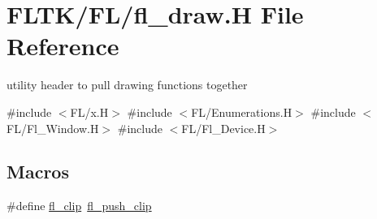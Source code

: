 \hypertarget{fl__draw_8_h}{}\section{F\+L\+T\+K/\+F\+L/fl\+\_\+draw.H File Reference}
\label{fl__draw_8_h}


utility header to pull drawing functions together  


{\ttfamily \#include $<$F\+L/x.\+H$>$}\newline
{\ttfamily \#include $<$F\+L/\+Enumerations.\+H$>$}\newline
{\ttfamily \#include $<$F\+L/\+Fl\+\_\+\+Window.\+H$>$}\newline
{\ttfamily \#include $<$F\+L/\+Fl\+\_\+\+Device.\+H$>$}\newline
\subsection*{Macros}
\begin{DoxyCompactItemize}
\item 
\#define \hyperlink{group__fl__drawings_ga0061bafa4252431de247713975e4c3ef}{fl\+\_\+clip}~\hyperlink{group__fl__drawings_gabe60242ba3b975800717b95cb6bc06d2}{fl\+\_\+push\+\_\+clip}
\end{DoxyCompactItemize}
